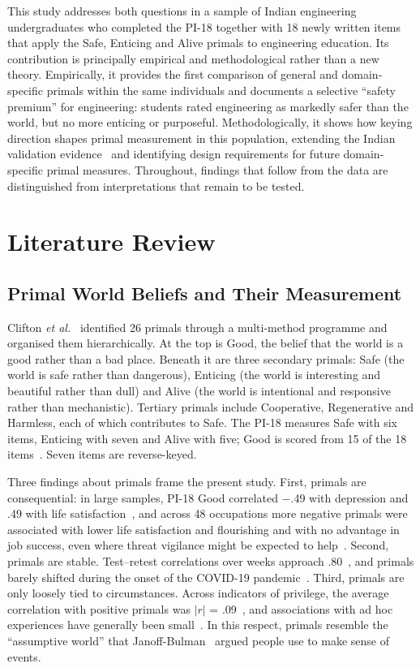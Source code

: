 \documentclass[journal,a4paper]{IEEEtran}
\begin{document}
This study addresses both questions in a sample of Indian engineering undergraduates who completed the PI-18 together with 18 newly written items that apply the Safe, Enticing and Alive primals to engineering education. Its contribution is principally empirical and methodological rather than a new theory. Empirically, it provides the first comparison of general and domain-specific primals within the same individuals and documents a selective ``safety premium'' for engineering: students rated engineering as markedly safer than the world, but no more enticing or purposeful. Methodologically, it shows how keying direction shapes primal measurement in this population, extending the Indian validation evidence~\cite{bhatnagar2024} and identifying design requirements for future domain-specific primal measures. Throughout, findings that follow from the data are distinguished from interpretations that remain to be tested.

\section{Literature Review}

\subsection{Primal World Beliefs and Their Measurement}

Clifton \emph{et al.}~\cite{clifton2019} identified 26 primals through a multi-method programme and organised them hierarchically. At the top is Good, the belief that the world is a good rather than a bad place. Beneath it are three secondary primals: Safe (the world is safe rather than dangerous), Enticing (the world is interesting and beautiful rather than dull) and Alive (the world is intentional and responsive rather than mechanistic). Tertiary primals include Cooperative, Regenerative and Harmless, each of which contributes to Safe. The PI-18 measures Safe with six items, Enticing with seven and Alive with five; Good is scored from 15 of the 18 items~\cite{cliftonyaden2021}. Seven items are reverse-keyed.

Three findings about primals frame the present study. First, primals are consequential: in large samples, PI-18 Good correlated $-$.49 with depression and .49 with life satisfaction~\cite{cliftonyaden2021}, and across 48 occupations more negative primals were associated with lower life satisfaction and flourishing and with no advantage in job success, even where threat vigilance might be expected to help~\cite{cliftonmeindl2022}. Second, primals are stable. Test–retest correlations over weeks approach .80~\cite{cliftonyaden2021}, and primals barely shifted during the onset of the COVID-19 pandemic~\cite{ludwig2023}. Third, primals are only loosely tied to circumstances. Across indicators of privilege, the average correlation with positive primals was $| r |$ = .09~\cite{kerry2024}, and associations with ad hoc experiences have generally been small~\cite{clifton2020}. In this respect, primals resemble the ``assumptive world'' that Janoff-Bulman~\cite{janoff1989} argued people use to make sense of events.
\end{document}
